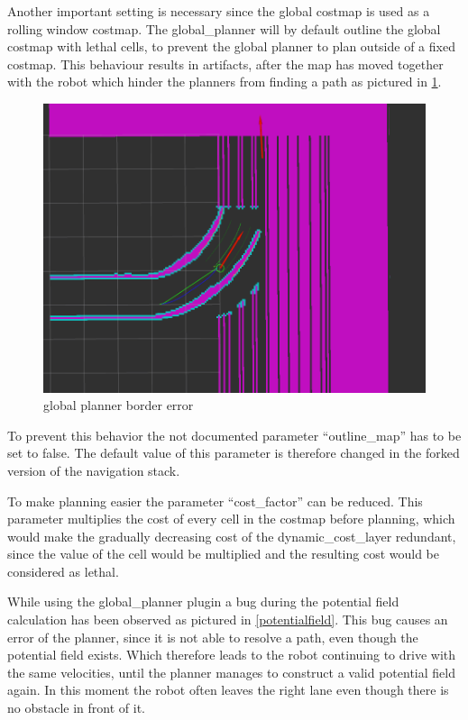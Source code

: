 Another important setting is necessary since the global costmap is used as a rolling window costmap. The global\_planner will by default outline the global costmap with lethal cells, to prevent the global planner to plan outside of a fixed costmap. This behaviour results in artifacts, after the map has moved together with the robot which hinder the planners from finding a path as pictured in \ref{boardererror}.

\begin{figure}[H]
	\centering
	\includegraphics[width=\textwidth]{Pictures/borders}
	
	\caption{global planner border error}
	\label{boardererror}
\end{figure}

To prevent this behavior the not documented parameter ``outline\_map'' has to be set to false. The default value of this parameter is therefore changed in the forked version of the navigation stack.

To make planning easier the parameter ``cost\_factor'' can be reduced. This parameter multiplies the cost of every cell in the costmap before planning, which
 would make the gradually decreasing cost of the dynamic\_cost\_layer redundant, since the value of the cell would be multiplied and the resulting cost would be considered as lethal.
 
 
 While using the global\_planner plugin a bug during the potential field calculation has been observed as pictured in \ref{potentialfield}. This bug causes an error of the planner, since it is not able to resolve a path, even though the potential field exists. Which therefore leads to the robot continuing to drive with the same velocities,  until the planner manages to construct a valid potential field again. In this moment the robot often leaves the right lane even though there is no obstacle in front of it.\\
 
